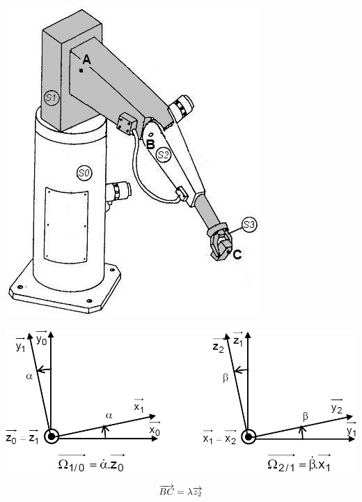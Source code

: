 \documentclass[10pt,oneside]{article}
\begin{document}
\begin{minipage}[c]{.5\linewidth}

\begin{center}
\includegraphics[width=.7\textwidth]{png/bras1}
\end{center}

\begin{center}
\includegraphics[width=\textwidth]{png/parametrage}
\end{center}

$$\overrightarrow{BC}=\lambda\overrightarrow{z_2}$$

\end{minipage}

%
%
\end{document}
